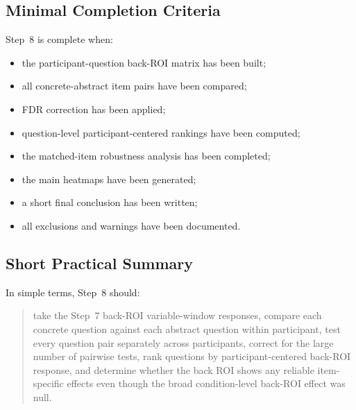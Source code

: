 \documentclass[11pt]{article}
\begin{document}
\subsection{Minimal Completion Criteria}
Step~8 is complete when:
\begin{itemize}
    \item the participant-question back-ROI matrix has been built;
    \item all concrete-abstract item pairs have been compared;
    \item FDR correction has been applied;
    \item question-level participant-centered rankings have been computed;
    \item the matched-item robustness analysis has been completed;
    \item the main heatmaps have been generated;
    \item a short final conclusion has been written;
    \item all exclusions and warnings have been documented.
\end{itemize}

\subsection{Short Practical Summary}
In simple terms, Step~8 should:
\begin{quote}
take the Step~7 back-ROI variable-window responses, compare each concrete question against each abstract
question within participant, test every question pair separately across participants, correct for the
large number of pairwise tests, rank questions by participant-centered back-ROI response, and determine
whether the back ROI shows any reliable item-specific effects even though the broad condition-level
back-ROI effect was null.
\end{quote}
\end{document}
